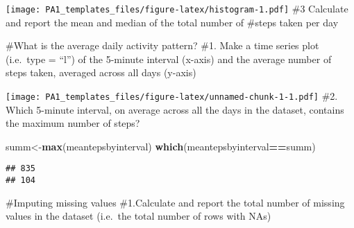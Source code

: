\documentclass[
]{article}
\newenvironment{Shaded}{\begin{snugshade}}{\end{snugshade}}
\newcommand{\DataTypeTok}[1]{\textcolor[rgb]{0.13,0.29,0.53}{#1}}
\newcommand{\KeywordTok}[1]{\textcolor[rgb]{0.13,0.29,0.53}{\textbf{#1}}}
\newcommand{\NormalTok}[1]{#1}
\newcommand{\OperatorTok}[1]{\textcolor[rgb]{0.81,0.36,0.00}{\textbf{#1}}}
\newcommand{\StringTok}[1]{\textcolor[rgb]{0.31,0.60,0.02}{#1}}
\begin{document}
\texttt{[image: PA1\_templates\_files/figure-latex/histogram-1.pdf]} \#3
Calculate and report the mean and median of the total number of \#steps
taken per day

\begin{Shaded}
\end{Shaded}

\#What is the average daily activity pattern? \#1. Make a time series
plot (i.e.~\color{red}{\verb|type = "l"|}type = ``l'') of the 5-minute
interval (x-axis) and the average number of steps taken, averaged across
all days (y-axis)

\begin{Shaded}
\end{Shaded}

\texttt{[image: PA1\_templates\_files/figure-latex/unnamed-chunk-1-1.pdf]}
\#2. Which 5-minute interval, on average across all the days in the
dataset, contains the maximum number of steps?

\begin{Shaded}
\begin{Highlighting}[]
\NormalTok{summ<-}\KeywordTok{max}\NormalTok{(meantepsbyinterval)}
\KeywordTok{which}\NormalTok{(meantepsbyinterval}\OperatorTok{==}\NormalTok{summ)}
\end{Highlighting}
\end{Shaded}

\begin{verbatim}
## 835 
## 104
\end{verbatim}

\#Imputing missing values \#1.Calculate and report the total number of
missing values in the dataset (i.e.~the total number of rows with NAs)
\end{document}
